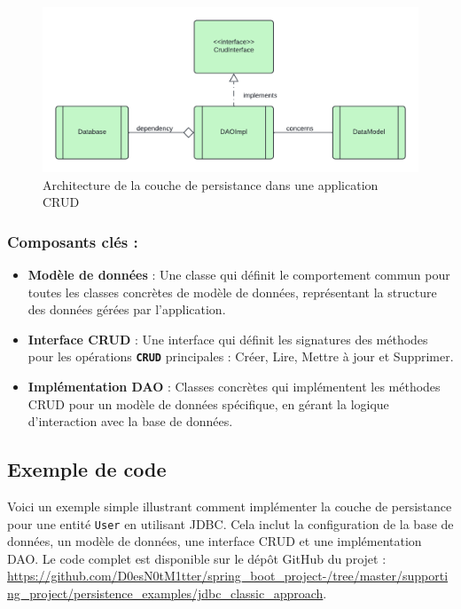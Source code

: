 \documentclass{article}
\begin{document}
\begin{figure}[H]
    \centering
    \begin{framed}
        \includegraphics[width=0.8\linewidth]{images/jdbc_business_logic.png}
    \end{framed}
    \caption{Architecture de la couche de persistance dans une application CRUD}
    \label{fig:spring-logo}
\end{figure}
\subsubsection*{Composants clés :}

\begin{itemize}
    \item \textbf{Modèle de données} : Une classe qui définit le comportement commun pour toutes les classes concrètes de modèle de données, représentant la structure des données gérées par l'application.

    \item \textbf{Interface CRUD} : Une interface qui définit les signatures des méthodes pour les opérations \textbf{\texttt{CRUD}} principales : Créer, Lire, Mettre à jour et Supprimer.

    \item \textbf{Implémentation DAO} : Classes concrètes qui implémentent les méthodes CRUD pour un modèle de données spécifique, en gérant la logique d'interaction avec la base de données.
\end{itemize}

\subsection{Exemple de code }

Voici un exemple simple illustrant comment implémenter la couche de persistance pour une entité \texttt{User} en utilisant JDBC. Cela inclut la configuration de la base de données, un modèle de données, une interface CRUD et une implémentation DAO. Le code complet est disponible sur le dépôt GitHub du projet :\\ \url{https://github.com/D0esN0tM1tter/spring_boot_project-/tree/master/supporting_project/persistence_examples/jdbc_classic_approach}.
\end{document}
